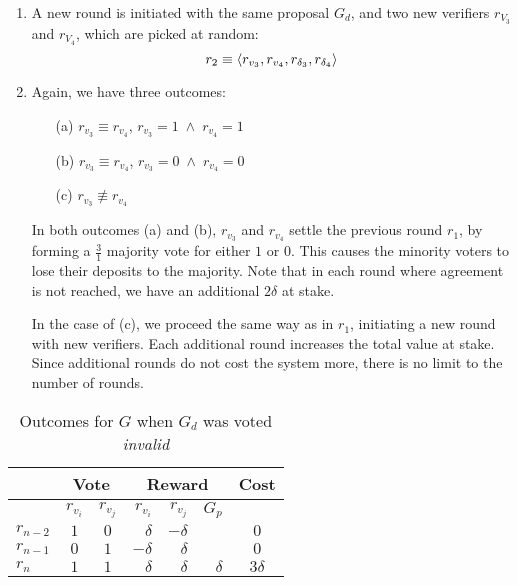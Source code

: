 \begin{enumerate}
    \item A new round is initiated with the same proposal $G_d$, and two new
        verifiers $r_{V_3}$ and $r_{V_4}$, which are picked at random:
        \begin{equation*}
            r_2 \equiv \langle r_{v_3}, r_{v_4}, r_{\delta_3}, r_{\delta_4} \rangle
        \end{equation*}
    \item Again, we have three outcomes:
        \smallskip
        \begin{enumerate}
            \item[(a)] $r_{v_3} \equiv r_{v_4}$, \qquad $r_{v_3} = 1 \; \wedge \; r_{v_4} = 1$
            \item[(b)] $r_{v_3} \equiv r_{v_4}$, \qquad $r_{v_3} = 0 \; \wedge \; r_{v_4} = 0$
            \item[(c)] $r_{v_3} \not\equiv r_{v_4}$
        \end{enumerate}
        \smallskip
        In both outcomes (a) and (b), $r_{v_3}$ and $r_{v_4}$ settle the
        previous round $r_1$, by forming a $\frac{3}{1}$ majority vote for
        either $1$ or $0$. This causes the minority voters to lose their
        deposits to the majority. Note that in each round where agreement is
        not reached, we have an additional $2\delta$ at stake.

        In the case of (c), we proceed the same way as in $r_1$, initiating a
        new round with new verifiers.  Each additional round increases the
        total value at stake. Since additional rounds do not cost the system
        more, there is no limit to the number of rounds.
\end{enumerate}

\begin{table}[hbt]
    \caption{Outcomes for $G$ when $G_d$ was voted \emph{invalid}}
    \begin{tabular}{lccrrrc}
    \toprule
        \hspace   & \multicolumn{2}{c}{Vote} & \multicolumn{3}{c}{Reward} & Cost                    \\
    \midrule
        \hspace   & $r_{v_i}$  & $r_{v_j}$   & $r_{v_i}$ & $r_{v_j}$ & $G_p$    &                   \\
    \addlinespace[0.5em]
        $r_{n-2}$ & $1$        & $0$         & $\delta$  & $-\delta$ &          & $0$               \\
        $r_{n-1}$ & $0$        & $1$         & $-\delta$ & $\delta$  &          & $0$               \\
        $r_{n}$   & $1$        & $1$         & $\delta$  & $\delta$  & $\delta$ & $3\delta$         \\
    \bottomrule
    \end{tabular}
\end{table}

